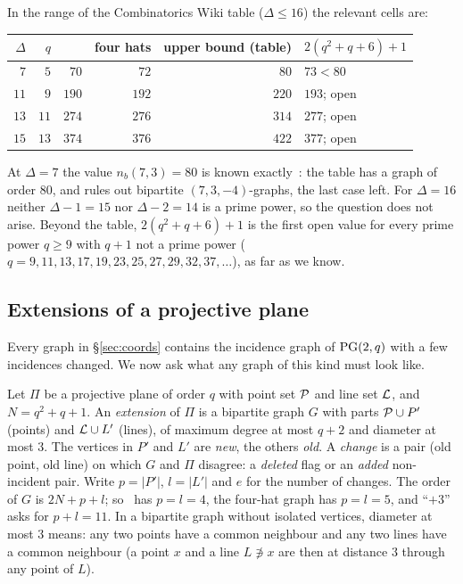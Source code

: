 In the range of the Combinatorics Wiki table ($\Delta \le 16$) the relevant cells are:
\begin{center}
\begin{tabular}{@{}rrrrrl@{}}
\toprule
$\Delta$ & $q$ & \cite{AL} & four hats & upper bound (table) & $2(q^2+q+6)+1$\\
\midrule
$7$ & $5$ & $70$ & $72$ & $80$ & $73 < 80$\\
$11$ & $9$ & $190$ & $192$ & $220$ & $193$; open\\
$13$ & $11$ & $274$ & $276$ & $314$ & $277$; open\\
$15$ & $13$ & $374$ & $376$ & $422$ & $377$; open\\
\bottomrule
\end{tabular}
\end{center}
At $\Delta = 7$ the value $n_b(7,3) = 80$ is known exactly~\cite{FMPV}: the table has a graph of order $80$, and
\cite[Thm.~4.1]{FMPV} rules out bipartite $(7,3,-4)$-graphs, the last case left. For $\Delta = 16$ neither
$\Delta - 1 = 15$ nor $\Delta - 2 = 14$ is a prime power, so the question does not arise.
Beyond the table, $2(q^2+q+6)+1$ is the first open value for every prime power $q \ge 9$ with $q+1$ not a prime power
($q = 9, 11, 13, 17, 19, 23, 25, 27, 29, 32, 37, \dots$), as far as we know.

\subsection{Extensions of a projective plane}\label{ssec:ext}
Every graph in \S\ref{sec:coords} contains the incidence graph of $\mathrm{PG}(2,q)$ with a few incidences changed.
We now ask what any graph of this kind must look like.

Let $\Pi$ be a projective plane of order $q$ with point set $\mathcal{P}$ and line set $\mathcal{L}$, and $N = q^2+q+1$.
An \emph{extension} of $\Pi$ is a bipartite graph $G$ with parts $\mathcal{P} \cup P'$ (points) and $\mathcal{L} \cup L'$ (lines),
of maximum degree at most $q+2$ and diameter at most $3$. The vertices in $P'$ and $L'$ are \emph{new}, the others
\emph{old}. A \emph{change} is a pair (old point, old line) on which $G$ and $\Pi$ disagree: a \emph{deleted} flag
or an \emph{added} non-incident pair. Write $p = |P'|$, $l = |L'|$ and $e$ for the number of changes.
The order of $G$ is $2N+p+l$; so~\cite{AL} has $p = l = 4$, the four-hat graph has $p = l = 5$, and ``$+3$'' asks for $p+l = 11$.
In a bipartite graph without isolated vertices, diameter at most $3$ means: any two points have a common neighbour
and any two lines have a common neighbour (a point $x$ and a line $L \not\ni x$ are then at distance $3$ through
any point of $L$).

